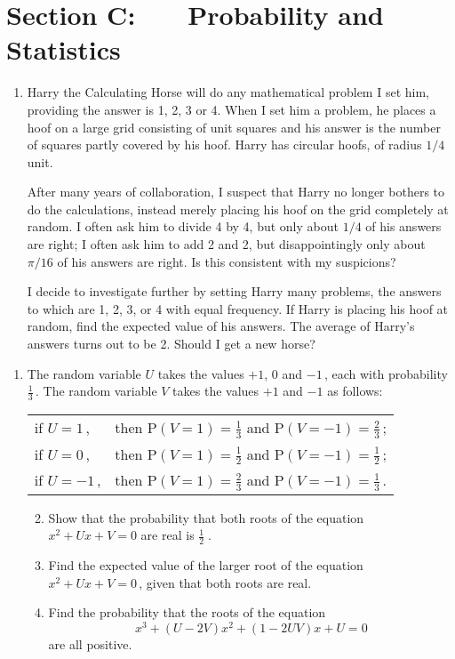 \documentclass[a4, 11pt]{report}
\newlength{\qspace}
\newcounter{qnumber}
\newenvironment{question}%
 {\vspace{\qspace}
  \begin{enumerate}[\bfseries 1\quad][10]%
    \setcounter{enumi}{\value{qnumber}}%
    \item%
 }
{
  \end{enumerate}
  \filbreak
  \stepcounter{qnumber}
 }
\newenvironment{questionparts}[1][1]%
 {
  \begin{enumerate}[\bfseries (i)]%
    \setcounter{enumii}{#1}
    \addtocounter{enumii}{-1}
    \setlength{\itemsep}{5mm}
    \setlength{\parskip}{8pt}
 }
 {
  \end{enumerate}
 }
\def\P{{\mathrm P}}
\begin{document}
	
	\newpage
\section*{Section C: \ \ \ Probability and Statistics}


\begin{question}
Harry the Calculating Horse will do any mathematical problem I set  him,
providing the answer is 1, 2, 3 or 4. When I set  him a problem,
he   places a  hoof on
a large  grid consisting of unit squares and  his   answer is  the 
number of squares partly covered by his hoof.
Harry has circular hoofs, of radius $1/4$ unit.


After many years of collaboration, I suspect that Harry no longer bothers to 
do the calculations, instead merely placing his hoof on the grid completely at random.
I often ask him to  divide 4 by 4, but only  about $1/4$ of his answers are right; 
I often ask him to add 2 and 2, but disappointingly only about 
$\pi/16$ of his answers are right. Is this consistent with my suspicions?

I decide to investigate  further by setting  Harry many problems,  the answers to which 
are 1, 2, 3, or 4 with equal frequency. If Harry is placing his hoof at random,
find the expected value of his answers. The average of Harry's answers turns out to 
be 2. Should I get a new horse? 

\end{question}

\begin{question}
The random variable $U$ takes the values $+1$, $0$ and $-1\,$, each with probability
$\frac13\,$. The random variable $V$ takes the values $+1$ and $-1$ as follows:
\begin{center}

\begin{tabular}{ll}
if $U=1\,$,&then $\P(V=1)= \frac13$ and $\P(V=-1)=\frac23\,$;\\[2mm]
if $U=0\,$,&then $\P(V=1)= \frac12$ and $\P(V=-1)=\frac12\,$;\\[2mm]
if $U=-1\,$,&then $\P(V=1)= \frac23$ and $\P(V=-1)=\frac13\,$.
\end{tabular}

\end{center}


\begin{questionparts}
\item Show that  the probability that
 both roots of the equation $x^2+Ux+V=0$ are real is $\frac12\;$.

\item Find the expected value of the larger root of the equation 
 $x^2+Ux+V=0\,$, given that both roots  are real.

\item
Find the probability that the roots of the equation
$$x^3+(U-2V)x^2+(1-2UV)x + U=0$$ are all positive.

\end{questionparts}
\end{question}
\end{document}
